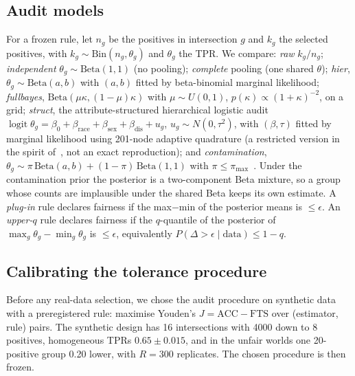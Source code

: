 \documentclass[11pt]{article}
\begin{document}
\subsection{Audit models}
For a frozen rule, let $n_g$ be the positives in intersection $g$ and $k_g$ the selected positives, with
$k_g\sim\text{Bin}(n_g,\theta_g)$ and $\theta_g$ the TPR. We compare:
\emph{raw} $k_g/n_g$;
\emph{independent} $\theta_g\sim\text{Beta}(1,1)$ (no pooling);
\emph{complete} pooling (one shared $\theta$);
\emph{hier}, $\theta_g\sim\text{Beta}(a,b)$ with $(a,b)$ fitted by beta-binomial marginal likelihood;
\emph{fullbayes}, $\text{Beta}(\mu\kappa,(1-\mu)\kappa)$ with $\mu\sim U(0,1)$, $p(\kappa)\propto(1+\kappa)^{-2}$, on a grid;
\emph{struct}, the attribute-structured hierarchical logistic audit
$\operatorname{logit}\theta_g=\beta_0+\beta_{\text{race}}+\beta_{\text{sex}}+\beta_{\text{dis}}+u_g$,
$u_g\sim N(0,\tau^2)$, with $(\beta,\tau)$ fitted by marginal likelihood using 201-node adaptive quadrature (a restricted
version in the spirit of~\cite{foulds2020bayes}, not an exact reproduction); and
\emph{contamination}, $\theta_g\sim\pi\,\text{Beta}(a,b)+(1-\pi)\,\text{Beta}(1,1)$ with $\pi\le\pi_{\max}$~\cite{berger1986}.
Under the contamination prior the posterior is a two-component Beta mixture, so a group whose counts are implausible
under the shared Beta keeps its own estimate. A \emph{plug-in} rule declares fairness if the max$-$min of the posterior
means is $\le\epsilon$. An \emph{upper-$q$} rule declares fairness if the $q$-quantile of the posterior of
$\max_g\theta_g-\min_g\theta_g$ is $\le\epsilon$, equivalently $P(\Delta>\epsilon\mid\text{data})\le1-q$.

\subsection{Calibrating the tolerance procedure}
Before any real-data selection, we chose the audit procedure on synthetic data with a preregistered rule: maximise
Youden's $J=\text{ACC}-\text{FTS}$ over (estimator, rule) pairs. The synthetic design has 16 intersections with
4000 down to 8 positives, homogeneous TPRs $0.65\pm0.015$, and in the unfair worlds one 20-positive group 0.20 lower,
with $R=300$ replicates. The chosen procedure is then frozen.
\end{document}
